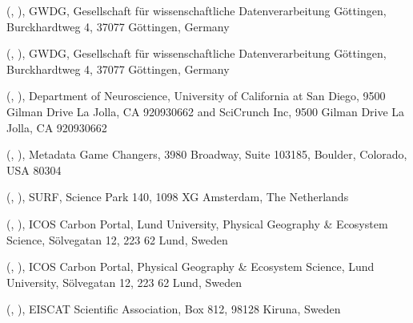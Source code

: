 \documentclass[a4paper,10pt,english]{sphinxmanual}
\begin{document}
\sphinxAtStartPar
{} (, ),
GWDG, Gesellschaft für wissenschaftliche Datenverarbeitung Göttingen,
Burckhardtweg 4, 37077 Göttingen, Germany

\sphinxAtStartPar
{} (, ),
GWDG, Gesellschaft für wissenschaftliche Datenverarbeitung Göttingen,
Burckhardtweg 4, 37077 Göttingen, Germany

\sphinxAtStartPar
{} (, ),
Department of Neuroscience, University of California at San Diego,
9500 Gilman Drive La Jolla, CA 92093\sphinxhyphen{}0662 and SciCrunch Inc, 9500
Gilman Drive La Jolla, CA 92093\sphinxhyphen{}0662

\sphinxAtStartPar
{} (, ),
Metadata Game Changers, 3980 Broadway, Suite 103\sphinxhyphen{}185, Boulder,
Colorado, USA 80304

\sphinxAtStartPar
{} (, ),
SURF, Science Park 140, 1098 XG Amsterdam, The Netherlands

\sphinxAtStartPar
{} (, ),
ICOS Carbon Portal, Lund University, Physical Geography \& Ecosystem
Science, Sölvegatan 12, 223 62 Lund, Sweden

\sphinxAtStartPar
{} (, ),
ICOS Carbon Portal, Physical Geography \& Ecosystem Science, Lund
University, Sölvegatan 12, 223 62 Lund, Sweden

\sphinxAtStartPar
{} (, ),
EISCAT Scientific Association, Box 812, 98128 Kiruna, Sweden
\end{document}
